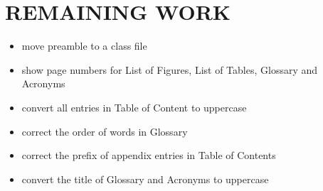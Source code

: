 \chapter{REMAINING WORK}
\begin{itemize}
  \item move preamble to a class file
  \item show page numbers for List of Figures, List of Tables, Glossary and Acronyms
  \item convert all entries in Table of Content to uppercase
  \item correct the order of words in Glossary
  \item correct the prefix of appendix entries in Table of Contents
  \item convert the title of Glossary and Acronyms to uppercase
\end{itemize}